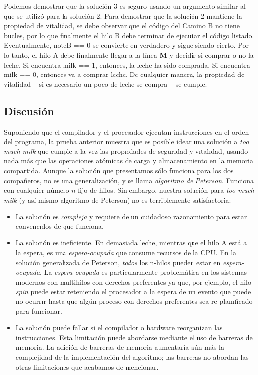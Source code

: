 \documentclass[10pt]{book}
\begin{document}
Podemos demostrar que la solución 3 es seguro usando un argumento similar al que se utilizó para la solución 2. Para demostrar que la solución 2 mantiene la propiedad de vitalidad, se debe observar que el código del {\mf Camino B} no tiene bucles, por lo que finalmente el hilo B debe terminar de ejecutar el código listado. Eventualmente, {\mf noteB == 0} se convierte en verdadero y sigue siendo cierto. Por lo tanto, el hilo A debe finalmente llegar a la línea \textbf{M} y decidir si comprar o no la leche. Si encuentra {\mf milk == 1}, entonces, la leche ha sido comprada. Si encuentra {\mf milk == 0}, entonces va a comprar leche. De cualquier manera, la propiedad de vitalidad -- si es necesario un poco de leche se compra -- se cumple.

\subsection{Discusión}
Suponiendo que el compilador y el procesador ejecutan instrucciones en el orden del programa, la prueba anterior muestra que es posible idear una solución a \textit{too much milk} que cumple a la vez las propiedades de seguridad y vitalidad, usando nada más que las operaciones atómicas de carga y almacenamiento en la memoria compartida. Aunque la solución que presentamos sólo funciona para los dos compañeros, no es una generalización, y se llama \textit{algoritmo de Peterson}. Funciona con cualquier número $n$ fijo de hilos. Sin embargo, nuestra solución para \textit{too much milk} (y así mismo algoritmo de Peterson) no es terriblemente satisfactoria:
\begin{itemize}
\item La solución es \textit{compleja} y requiere de un cuidadoso razonamiento para estar convencidos de que funciona.
\item La solución es ineficiente. En demasiada leche, mientras que el hilo A está a la espera, es una \textit{espera-ocupada} que consume recursos de la CPU. En la solución generalizada de Peterson, \textit{todos} los n-hilos pueden estar en \textit{espera-ocupada}. La \textit{espera-ocupada} es particularmente problemática en los sistemas modernos con multihilos con derechos preferentes ya que, por ejemplo, el hilo \textit{spin} puede estar reteniendo el procesador a la espera de un evento que puede no ocurrir hasta que algún proceso con derechos preferentes sea re-planificado para funcionar.
\item La solución puede fallar si el compilador o hardware reorganizan las instrucciones. Esta limitación puede abordarse mediante el uso de barreras de memoria. La adición de barreras de memoria aumentaría aún más la complejidad de la implementación del algoritmo; las barreras no abordan las otras limitaciones que acabamos de mencionar.
\end{itemize}
\end{document}
